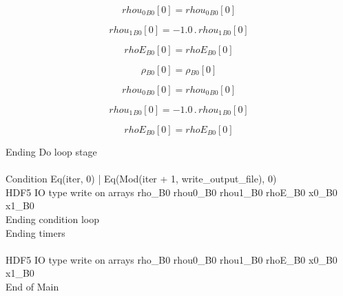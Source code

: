 \documentclass{article}
\begin{document}
\begin{dmath}{rhou_{0}{_{B0}}}[{0}] = {rhou_{0}{_{B0}}}[{0}]\end{dmath}

\begin{dmath}{rhou_{1}{_{B0}}}[{0}] = - 1.0 \,.\, {rhou_{1}{_{B0}}}[{0}]\end{dmath}

\begin{dmath}{rhoE{_{B0}}}[{0}] = {rhoE{_{B0}}}[{0}]\end{dmath}

\begin{dmath}{\rho{_{B0}}}[{0}] = {\rho{_{B0}}}[{0}]\end{dmath}

\begin{dmath}{rhou_{0}{_{B0}}}[{0}] = {rhou_{0}{_{B0}}}[{0}]\end{dmath}

\begin{dmath}{rhou_{1}{_{B0}}}[{0}] = - 1.0 \,.\, {rhou_{1}{_{B0}}}[{0}]\end{dmath}

\begin{dmath}{rhoE{_{B0}}}[{0}] = {rhoE{_{B0}}}[{0}]\end{dmath}

\noindent Ending Do loop stage\\
\\\noindent Condition Eq(iter, 0) | Eq(Mod(iter + 1, write_output_file), 0)\\\noindent HDF5 IO type write on arrays rho_B0 rhou0_B0 rhou1_B0 rhoE_B0 x0_B0 x1_B0\\\noindent Ending condition loop %
\\\noindent Ending timers\\
\\\noindent HDF5 IO type write on arrays rho_B0 rhou0_B0 rhou1_B0 rhoE_B0 x0_B0 x1_B0\\\noindent End of Main\\
\end{document}
